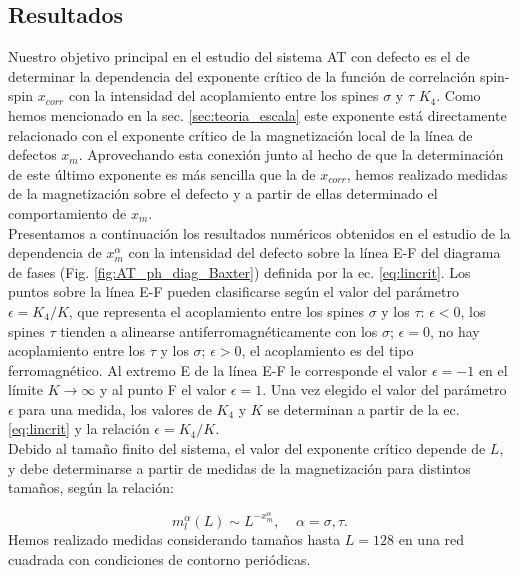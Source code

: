 \subsection{Resultados}
\label{sec:results_AT_line}

Nuestro objetivo principal en el estudio del sistema AT con defecto es el de determinar la dependencia
 del exponente crítico de la función de correlación spin-spin $x_{corr}$ con la intensidad del acoplamiento entre los spines
 $\sigma$ y $\tau$ $K_{4}$. Como hemos mencionado en la sec. \ref{sec:teoria_escala} este exponente está directamente relacionado
 con el exponente crítico de la magnetización local de la línea de defectos $x_{m}$. Aprovechando esta conexión junto al hecho de que
 la determinación de este último exponente es más sencilla que la de $x_{corr}$, hemos realizado medidas de la magnetización sobre el defecto
 y a partir de ellas determinado el comportamiento de $x_{m}$.\\

Presentamos a continuación los resultados numéricos obtenidos en el estudio de la dependencia de
 $x_{m}^{\alpha}$ con la intensidad del defecto sobre la l\'inea E-F del diagrama de fases (Fig. \ref{fig:AT_ph_diag_Baxter}) definida por la ec. \ref{eq:lincrit}.
Los puntos sobre la l\'inea E-F pueden clasificarse seg\'un el valor del par\'ametro $\epsilon=K_{4}/K$, que representa el acoplamiento
 entre los spines $\sigma$ y los $\tau$:
$\epsilon<0$, los spines $\tau$ tienden a alinearse antiferromagnéticamente con los $\sigma$; $\epsilon=0$, no hay acoplamiento
 entre los $\tau$ y los $\sigma$; $\epsilon>0$, el acoplamiento es del tipo ferromagnético.
Al extremo E de la l\'inea E-F le corresponde el valor $\epsilon = -1$ en el l\'imite $K\rightarrow \infty$ y al punto F el valor $\epsilon = 1$.
 Una vez elegido el valor del par\'ametro $\epsilon$
 para una medida, los valores de $K_{4}$ y $K$ se determinan a  partir de la ec. \ref{eq:lincrit} y la relaci\'on $\epsilon=K_{4}/K$.\\

Debido al tamaño finito del sistema, el valor del exponente cr\'itico depende de $L$, y debe determinarse a partir de medidas de la magnetización para distintos tamaños,
 seg\'un la relación:

\begin{equation}
	\label{eq:magvsL}
	m_{l}^{\alpha}(L)\sim L^{-x_{m}^{\alpha}}, \; \; \; \; \alpha=\sigma , \tau .
\end{equation}
Hemos realizado medidas considerando tamaños hasta $L=128$ en una red cuadrada con condiciones de contorno periódicas.\\

